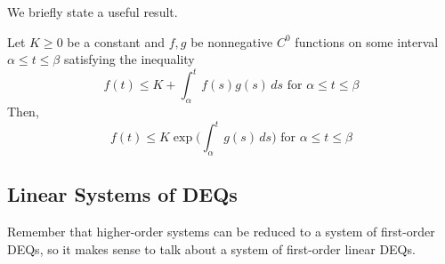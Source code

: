 \documentclass{article}
\begin{document}
    We briefly state a useful result. 

    \begin{lemma}
      \label{thm:gronwall-inequality-2}
    Let $K \geq 0$ be a constant and $f, g$ be nonnegative $C^0$ functions on some interval $\alpha \leq t \leq \beta$ satisfying the inequality
    \begin{equation}
      f(t) \leq K + \int_\alpha^t f(s) g(s) \, ds \text{ for } \alpha \leq t \leq \beta
    \end{equation}
    Then, 
    \begin{equation}
      f(t) \leq K \exp \bigg( \int_{\alpha}^t g(s) \,ds \bigg) \text{ for } \alpha \leq t \leq \beta
    \end{equation}
    \end{lemma}

  \subsection{Linear Systems of DEQs}

    Remember that higher-order systems can be reduced to a system of first-order DEQs, so it makes sense to talk about a system of first-order linear DEQs. 
\end{document}
